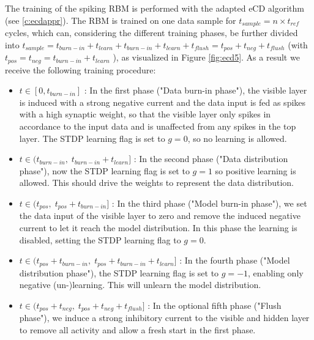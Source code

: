 The training of the spiking RBM is performed with the adapted eCD algorithm (see \ref{c:ecdappr}).
The RBM is trained on one data sample for $t_{sample} = n \times t_{ref}$ cycles, which can, considering the different training phases, be further divided into $t_{sample} = t_{burn-in} + t_{learn} + t_{burn-in} + t_{learn} + t_{flush} = t_{pos} + t_{neg} + t_{flush}$ (with $t_{pos} = t_{neg} = t_{burn-in} + t_{learn}$ ), as visualized in Figure \ref{fig:ecd5}. 
As a result we receive the following training procedure:
\begin{itemize}

\item $t \in [0, t_{burn-in}]$ : In the first phase ("Data burn-in phase"), the visible layer is induced with a strong negative current and the data input is fed as spikes with a high synaptic weight, so that the visible layer only spikes in accordance to the input data and is unaffected from any spikes in the top layer.
The STDP learning flag is set to $g=0$, so no learning is allowed.

\item $t \in (t_{burn-in} , \; t_{burn-in} + t_{learn}]$ : In the second phase ("Data distribution phase"), now the STDP learning flag is set to $g=1$ so positive learning is allowed.
This should drive the weights to represent the data distribution.

\item $t \in (t_{pos}, \;  t_{pos} + t_{burn-in}]$ : In the third phase ("Model burn-in phase"), we set the data input of the visible layer to zero and remove the induced negative current to let it reach the model distribution.
In this phase the learning is disabled, setting the STDP learning flag to $g=0$.

\item $t \in (t_{pos} + t_{burn-in}, \;  t_{pos} + t_{burn-in} + t_{learn}]$ : In the fourth phase ("Model distribution phase"), the STDP learning flag is set to $g=-1$, enabling only negative (un-)learning.
This will unlearn the model distribution.

\item $t \in (t_{pos} + t_{neg}, \;  t_{pos} + t_{neg} + t_{flush}]$ : In the optional fifth phase ("Flush phase"), we induce a strong inhibitory current to the visible and hidden layer to remove all activity and allow a fresh start in the first phase.

\end{itemize}


